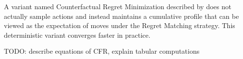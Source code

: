 \documentclass[preprint,12pt,authoryear,doubleblind]{elsarticle}
\theoremstyle{definition}
\begin{document}
A variant named Counterfactual Regret Minimization described by \cite{neller2013introduction} does not actually sample actions and instead maintains a cumulative profile that can be viewed as the expectation of moves under the Regret Matching strategy. This deterministic variant converges faster in practice.

TODO: describe equations of CFR, explain tabular computations







\end{document}

